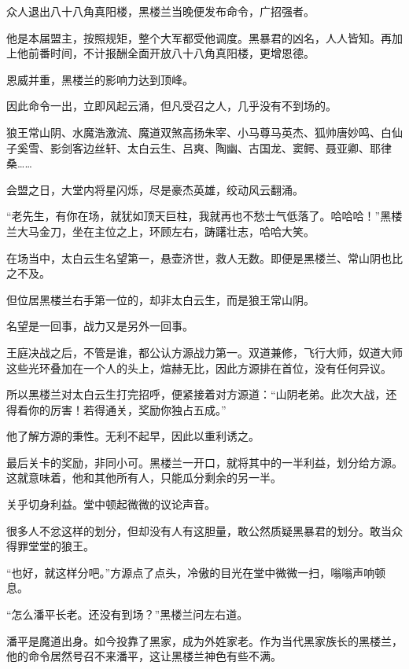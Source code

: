 
\begin{this_body}



众人退出八十八角真阳楼，黑楼兰当晚便发布命令，广招强者。

他是本届盟主，按照规矩，整个大军都受他调度。黑暴君的凶名，人人皆知。再加上他前番时间，不计报酬全面开放八十八角真阳楼，更增恩德。

恩威并重，黑楼兰的影响力达到顶峰。

因此命令一出，立即风起云涌，但凡受召之人，几乎没有不到场的。

狼王常山阴、水魔浩激流、魔道双煞高扬朱宰、小马尊马英杰、狐帅唐妙鸣、白仙子奚雪、影剑客边丝轩、太白云生、吕爽、陶幽、古国龙、窦鳄、聂亚卿、耶律桑……

会盟之日，大堂内将星闪烁，尽是豪杰英雄，绞动风云翻涌。

“老先生，有你在场，就犹如顶天巨柱，我就再也不愁士气低落了。哈哈哈！”黑楼兰大马金刀，坐在主位之上，环顾左右，踌躇壮志，哈哈大笑。

在场当中，太白云生名望第一，悬壶济世，救人无数。即便是黑楼兰、常山阴也比之不及。

但位居黑楼兰右手第一位的，却非太白云生，而是狼王常山阴。

名望是一回事，战力又是另外一回事。

王庭决战之后，不管是谁，都公认方源战力第一。双道兼修，飞行大师，奴道大师这些光环叠加在一个人的头上，煊赫无比，因此方源排在首位，没有任何异议。

所以黑楼兰对太白云生打完招呼，便紧接着对方源道：“山阴老弟。此次大战，还得看你的厉害！若得通关，奖励你独占五成。”

他了解方源的秉性。无利不起早，因此以重利诱之。

最后关卡的奖励，非同小可。黑楼兰一开口，就将其中的一半利益，划分给方源。这就意味着，他和其他所有人，只能瓜分剩余的另一半。

关乎切身利益。堂中顿起微微的议论声音。

很多人不忿这样的划分，但却没有人有这胆量，敢公然质疑黑暴君的划分。敢当众得罪堂堂的狼王。

“也好，就这样分吧。”方源点了点头，冷傲的目光在堂中微微一扫，嗡嗡声响顿息。

“怎么潘平长老。还没有到场？”黑楼兰问左右道。

潘平是魔道出身。如今投靠了黑家，成为外姓家老。作为当代黑家族长的黑楼兰，他的命令居然号召不来潘平，这让黑楼兰神色有些不满。


\end{this_body}
